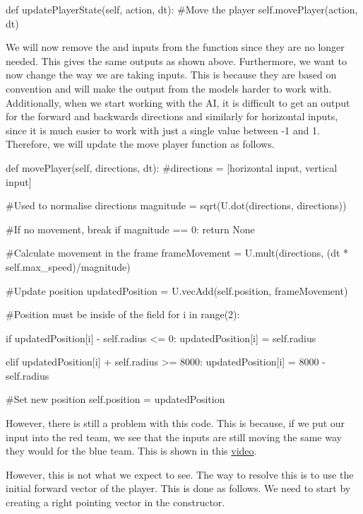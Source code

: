 \begin{mpy}
    def updatePlayerState(self, action, dt):
        #Move the player
        self.movePlayer(action, dt)
\end{mpy}

We will now remove the  and  inputs from the  function since they are no longer needed. This gives the same outputs as shown above. Furthermore, we want to now change the way we are taking inputs. This is because they are based on convention and will make the output from the models harder to work with. Additionally, when we start working with the AI, it is difficult to get an output for the forward and backwards directions and similarly for horizontal inputs, since it is much easier to work with just a single value between -1 and 1. Therefore, we will update the move player function as follows.

\begin{mpy}
    def movePlayer(self, directions, dt):
        #directions = [horizontal input, vertical input]

        #Used to normalise directions
        magnitude = sqrt(U.dot(directions, directions))

        #If no movement, break
        if magnitude == 0:
                return None

        #Calculate movement in the frame
        frameMovement = U.mult(directions, (dt * self.max_speed)/magnitude)

        #Update position
        updatedPosition = U.vecAdd(self.position, frameMovement)

        #Position must be inside of the field
        for i in range(2):
                
            if updatedPosition[i] - self.radius <= 0:
                updatedPosition[i] = self.radius

            elif updatedPosition[i] + self.radius >= 8000:
                updatedPosition[i] = 8000 - self.radius

        #Set new position
        self.position = updatedPosition
\end{mpy}

However, there is still a problem with this code. This is because, if we put our input into the red team, we see that the inputs are still moving the same way they would for the blue team. This is shown in this \href{https://youtu.be/XTUu_KktHLQ}{video}.

However, this is not what we expect to see. The way to resolve this is to use the initial forward vector of the player. This is done as follows. We need to start by creating a right pointing vector in the constructor.

